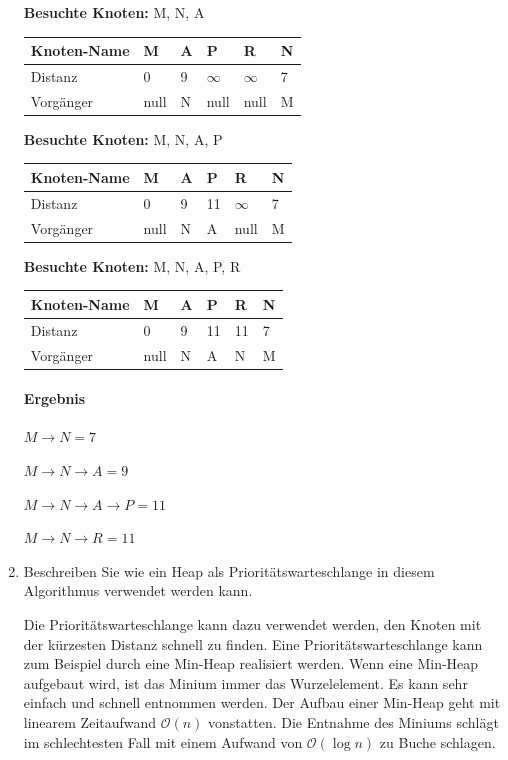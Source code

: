 \documentclass{lehramt-informatik-haupt}
\begin{document}
\begin{enumerate}
\textbf{Besuchte Knoten:} M, N, A

\begin{tabular}{l||l|l|l|l|l}
Knoten-Name & M    & A        & P        & R        & N \\\hline
Distanz     & 0    & 9        & $\infty$ & $\infty$ & 7 \\
Vorgänger   & null & N        & null     & null     & M \\
\end{tabular}

\textbf{Besuchte Knoten:} M, N, A, P

\begin{tabular}{l||l|l|l|l|l}
Knoten-Name & M    & A        & P        & R        & N \\\hline
Distanz     & 0    & 9        & 11       & $\infty$ & 7 \\
Vorgänger   & null & N        & A        & null     & M \\
\end{tabular}

\textbf{Besuchte Knoten:} M, N, A, P, R

\begin{tabular}{l||l|l|l|l|l}
Knoten-Name & M    & A        & P        & R        & N \\\hline
Distanz     & 0    & 9        & 11       & 11       & 7 \\
Vorgänger   & null & N        & A        & N        & M \\
\end{tabular}

\paragraph{Ergebnis}

$M \rightarrow N = 7$

$M \rightarrow N \rightarrow A = 9$

$M \rightarrow N \rightarrow A \rightarrow P = 11$

$M \rightarrow N \rightarrow R = 11$


\item Beschreiben Sie wie ein Heap als Prioritätswarteschlange in diesem
Algorithmus verwendet werden kann.

\begin{liAntwort}
Die Prioritätswarteschlange kann dazu verwendet werden, den Knoten mit
der kürzesten Distanz schnell zu finden. Eine Prioritätswarteschlange
kann zum Beispiel durch eine Min-Heap realisiert werden. Wenn eine
Min-Heap aufgebaut wird, ist das Minium immer das Wurzelelement. Es kann
sehr einfach und schnell entnommen werden. Der Aufbau einer Min-Heap
geht mit linearem Zeitaufwand $\mathcal{O}(n)$ vonstatten. Die
Entnahme des Miniums schlägt im schlechtesten Fall mit einem Aufwand
von $\mathcal{O}(\log n)$ zu Buche schlagen.
\end{liAntwort}


\end{enumerate}
\end{document}
